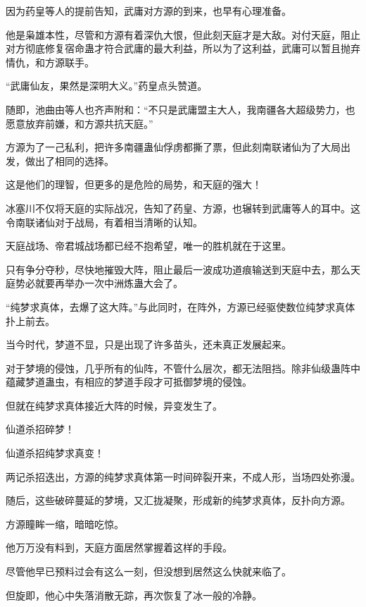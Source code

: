 
\begin{this_body}



因为药皇等人的提前告知，武庸对方源的到来，也早有心理准备。

他是枭雄本性，尽管和方源有着深仇大恨，但此刻天庭才是大敌。对付天庭，阻止对方彻底修复宿命蛊才符合武庸的最大利益，所以为了这利益，武庸可以暂且抛弃情仇，和方源联手。

“武庸仙友，果然是深明大义。”药皇点头赞道。

随即，池曲由等人也齐声附和：“不只是武庸盟主大人，我南疆各大超级势力，也愿意放弃前嫌，和方源共抗天庭。”

方源为了一己私利，把许多南疆蛊仙俘虏都撕了票，但此刻南联诸仙为了大局出发，做出了相同的选择。

这是他们的理智，但更多的是危险的局势，和天庭的强大！

冰塞川不仅将天庭的实际战况，告知了药皇、方源，也辗转到武庸等人的耳中。这令南联诸仙对于战局，有着相当清晰的认知。

天庭战场、帝君城战场都已经不抱希望，唯一的胜机就在于这里。

只有争分夺秒，尽快地摧毁大阵，阻止最后一波成功道痕输送到天庭中去，那么天庭势必就要再举办一次中洲炼蛊大会了。

“纯梦求真体，去爆了这大阵。”与此同时，在阵外，方源已经驱使数位纯梦求真体扑上前去。

当今时代，梦道不显，只是出现了许多苗头，还未真正发展起来。

对于梦境的侵蚀，几乎所有的仙阵，不管什么层次，都无法阻挡。除非仙级蛊阵中蕴藏梦道蛊虫，有相应的梦道手段才可抵御梦境的侵蚀。

但就在纯梦求真体接近大阵的时候，异变发生了。

仙道杀招碎梦！

仙道杀招纯梦求真变！

两记杀招迭出，方源的纯梦求真体第一时间碎裂开来，不成人形，当场四处弥漫。

随后，这些破碎蔓延的梦境，又汇拢凝聚，形成新的纯梦求真体，反扑向方源。

方源瞳眸一缩，暗暗吃惊。

他万万没有料到，天庭方面居然掌握着这样的手段。

尽管他早已预料过会有这么一刻，但没想到居然这么快就来临了。

但旋即，他心中失落消散无踪，再次恢复了冰一般的冷静。


\end{this_body}
